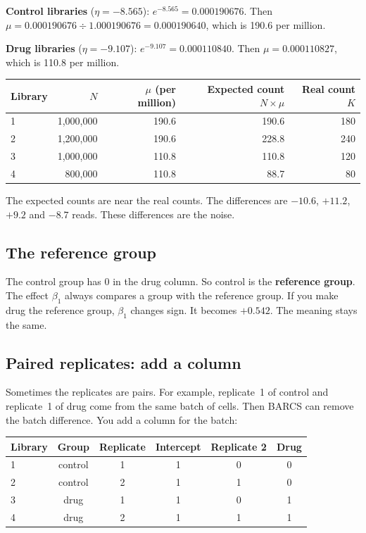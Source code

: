 \begin{worked}
\textbf{Control libraries} ($\eta = -8.565$):
$e^{-8.565} = 0.000190676$. Then
$\mu = 0.000190676 \div 1.000190676 = 0.000190640$, which is 190.6 per
million.

\textbf{Drug libraries} ($\eta = -9.107$):
$e^{-9.107} = 0.000110840$. Then $\mu = 0.000110827$, which is 110.8 per
million.

\begin{tabular}{@{}lrrrr@{}}
\toprule
Library & $N$ & $\mu$ (per million) & Expected count $N \times \mu$ & Real count $K$\\
\midrule
1 & 1{,}000{,}000 & 190.6 & 190.6 & 180\\
2 & 1{,}200{,}000 & 190.6 & 228.8 & 240\\
3 & 1{,}000{,}000 & 110.8 & 110.8 & 120\\
4 &   800{,}000 & 110.8 &  88.7 &  80\\
\bottomrule
\end{tabular}

\smallskip
The expected counts are near the real counts. The differences are
$-10.6$, $+11.2$, $+9.2$ and $-8.7$ reads. These differences are the noise.
\end{worked}

\subsection{The reference group}

The control group has 0 in the drug column. So control is the
\textbf{reference group}. The effect $\beta_1$ always compares a group with
the reference group. If you make drug the reference group, $\beta_1$ changes
sign. It becomes $+0.542$. The meaning stays the same.

\subsection{Paired replicates: add a column}

Sometimes the replicates are pairs. For example, replicate~1 of control and
replicate~1 of drug come from the same batch of cells. Then BARCS can remove
the batch difference. You add a column for the batch:

\begin{center}
\begin{tabular}{lcc|ccc}
\toprule
Library & Group & Replicate & Intercept & Replicate 2 & Drug\\
\midrule
1 & control & 1 & 1 & 0 & 0\\
2 & control & 2 & 1 & 1 & 0\\
3 & drug    & 1 & 1 & 0 & 1\\
4 & drug    & 2 & 1 & 1 & 1\\
\bottomrule
\end{tabular}
\end{center}

